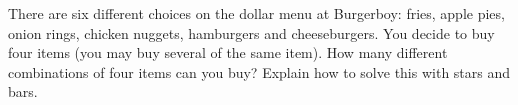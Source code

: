 There are six different choices on the dollar menu at Burgerboy: fries, apple pies, onion rings, chicken nuggets, hamburgers and cheeseburgers. You decide to buy four items (you may buy several of the same item). How many different combinations of four items can you buy? Explain how to solve this with stars and bars.
